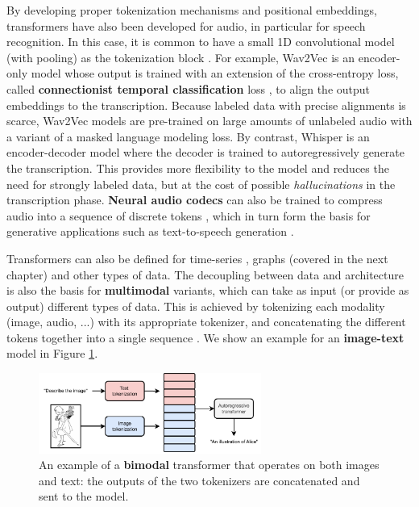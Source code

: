By developing proper tokenization mechanisms and positional embeddings, transformers have also been developed for audio, in particular for speech recognition. In this case, it is common to have a small 1D convolutional model (with pooling) as the tokenization block \cite{baevski2020wav2vec,radford2023robust}. For example, Wav2Vec \cite{baevski2020wav2vec} is an encoder-only model whose output is trained with an extension of the cross-entropy loss, called \textbf{connectionist temporal classification} loss \cite{graves2012connectionist}, to align the output embeddings to the transcription. Because labeled data with precise alignments is scarce, Wav2Vec models are pre-trained on large amounts of unlabeled audio with a variant of a masked language modeling loss. By contrast, Whisper \cite{radford2023robust} is an encoder-decoder model where the decoder is trained to autoregressively generate the transcription. This provides more flexibility to the model and reduces the need for strongly labeled data, but at the cost of possible \textit{hallucinations} in the transcription phase. \textbf{Neural audio codecs} can also be trained to compress audio into a sequence of discrete tokens \cite{defossez2022high}, which in turn form the basis for generative applications such as text-to-speech generation \cite{wang2023neural}.

Transformers can also be defined for time-series \cite{ansari2024chronos}, graphs (covered in the next chapter) and other types of data. The decoupling between data and architecture is also the basis for \textbf{multimodal} variants, which can take as input (or provide as output) different types of data. This is achieved by tokenizing each modality (image, audio, ...) with its appropriate tokenizer, and concatenating the different tokens together into a single sequence \cite{bordes2024introduction}. We show an example for an \textbf{image-text} model in Figure \ref{fig:multimodal_transformer}.

\begin{figure}
    \centering
    \hspace{1em}\includegraphics[width=0.65\textwidth]{images/multimodal_transformer}
    \caption{An example of a \textbf{bimodal} transformer that operates on both images and text: the outputs of the two tokenizers are concatenated and sent to the model.}
    \label{fig:multimodal_transformer}
\end{figure}

